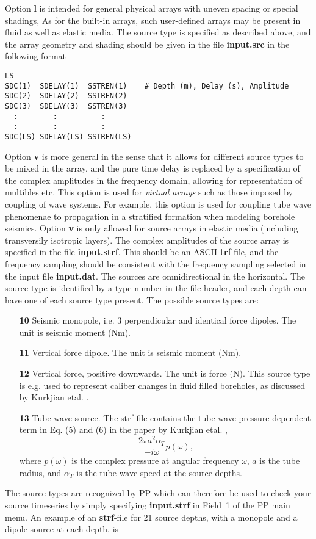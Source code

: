 Option {\bf l} is intended
for general physical arrays with uneven spacing or special shadings,
As for the built-in arrays, such user-defined arrays may be present in
fluid as well as elastic media. The source type is specified as
described above, and the array geometry and shading should be given
in the file {\bf input.src} in the following format

\small
\begin{verbatim}
LS
SDC(1)  SDELAY(1)  SSTREN(1)    # Depth (m), Delay (s), Amplitude
SDC(2)  SDELAY(2)  SSTREN(2) 
SDC(3)  SDELAY(3)  SSTREN(3) 
  :        :          :
  :        :          :
SDC(LS) SDELAY(LS) SSTREN(LS) 
\end{verbatim}
\normalsize


Option {\bf v} is more general in the
sense that it allows for different source types to be mixed in the
array, and the pure time delay is replaced by a specification of the
complex amplitudes in the frequency domain, allowing for
representation of multibles etc. This option is used for {\em virtual
arrays} such as those imposed by coupling of wave systems. For
example, 
this option
is used for coupling tube wave phenomenae to propagation in a
stratified formation when modeling borehole seismics. Option {\bf v}
is only allowed for source arrays in elastic media (including
transversily isotropic layers). The complex amplitudes of the source
array is specified in the file {\bf input.strf}. This should be an
ASCII {\bf trf} file, and the frequency sampling should be consistent
with the frequency sampling selected in the input file {\bf input.dat}.
The sources are omnidirectional in the
horizontal.
The source type is identified by a type number in the file header, 
and each depth can
have one of each source type present. The possible source types are:
\begin{itemize}
\item[{\bf 10}] Seismic monopole, i.e. 3 perpendicular and identical
force dipoles. The unit is seismic moment (Nm).
\item[{\bf 11}] Vertical force dipole. The unit is seismic moment
(Nm).
\item[{\bf 12}] Vertical force, positive downwards. The unit is force
(N). This source type is e.g. used to represent caliber changes in fluid filled boreholes, as discussed by Kurkjian etal. \cite{Kurkjian_94}. 
\item[{\bf 13}] Tube wave source. The strf file contains the tube wave
pressure dependent term in Eq. (5) and (6) in the paper by Kurkjian
etal. \cite{Kurkjian_94},
\begin{displaymath}
\frac{2 \pi a^2 \alpha_T}{-i \omega} p(\omega),
\end{displaymath}
where $p(\omega)$ is the complex pressure at angular frequency $\omega$, $a$ is the tube radius, and $\alpha_T$ is the tube wave speed at the source depths. 
\end{itemize}
The source types are recognized by PP which can therefore be used to
check your source timeseries by simply specifying {\bf input.strf} in
Field~1 of the PP main menu. 
An example of an {\bf strf}-file for 21 source depths, with a monopole
and a dipole source  at each depth, is

